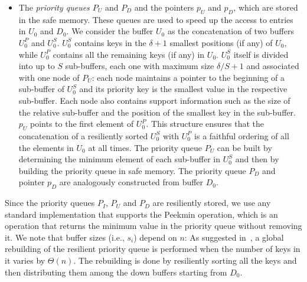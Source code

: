 \documentclass[review,number]{elsarticle}
\newcommand{\BT}[1]{{\Theta}\left(#1\right)}
\newcommand{\Peekmin}{\textsf{Peekmin}}
\begin{document}
\begin{itemize}
\item The \emph{priority queues $P_{U}$} and \emph{$P_{D}$} and the pointers
\emph{$p_U$} and \emph{$p_D$}, which are stored in the safe memory. These queues
are used to speed up the access to
entries in $U_0$ and $D_0$. We consider the buffer $U_{0}$ as the concatenation
of two buffers $U^{P}_{0}$ and $U^{S}_{0}$. $U^{S}_{0}$ contains  keys in the
$\delta +1$ smallest positions (if any) of $U_0$, while $U^{P}_{0}$ contains all
the remaining keys (if any) in $U_0$. $U^{S}_{0}$ itself is divided into up to
$S$
sub-buffers, each one with maximum size ${\delta/S+1}$ and associated with one
node of $P_U$: each node maintains a pointer to the beginning of a sub-buffer of
$U^{S}_{0}$ and its priority key is the smallest value in the respective
sub-buffer. Each node also contains support information such as the size of the relative sub-buffer
and the position of the smallest key in the sub-buffer.
$p_U$ points to the first element of $U^{P}_{0}$. This
structure ensures that the concatenation of a resiliently sorted $U^{S}_{0}$
with $U^{P}_{0}$ is a faithful ordering of all the elements in $U_0$ at all
times.  The priority queue $P_U$ can be built by determining the minimum element
of each sub-buffer in $U^{S}_{0}$ and then by building the
priority queue in safe memory. The priority queue $P_{D}$ and pointer $p_D$ are
analogously constructed from buffer $D_0$.
\end{itemize}

Since the priority queues $P_{I}$, $P_{U}$ and $P_{D}$ are resiliently stored,
we use any standard implementation that supports the \Peekmin{} operation, which
is an operation that returns the minimum value in the priority queue without
removing it. We note that buffer sizes (i.e., $s_i$) depend on $n$: As
suggested in~\cite{JMM07}, a global rebuilding of the resilient priority queue
is performed when the number of keys in it varies by $\BT{n}$. The rebuilding is
done by resiliently sorting all the keys and then distributing them among the
down buffers starting from $D_0$. 
\end{document}
